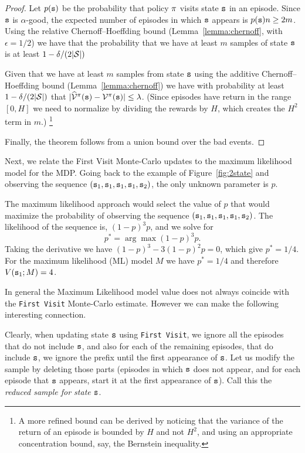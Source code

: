 \begin{advanced}
\begin{proof}
Let $p({\tt s})$ be the probability that policy $\pi$ visits
state ${\tt s}$ in an episode. Since ${\tt s}$ is $\alpha$-good, the
expected number of episodes in which ${\tt s}$ appears is
$p({\tt s})n\geq 2m$. Using the relative
Chernoff--Hoeffding bound (Lemma~\ref{lemma:chernoff}, with $\epsilon=1/2$) we have that
the probability that we have at least $m$ samples of state ${\tt s}$
is at least $1-\delta/(2|\mathcal{S}|)$

Given that we have at least $m$ samples from state ${\tt s}$ using
the additive Chernoff--Hoeffding bound (Lemma~\ref{lemma:chernoff})
we have with probability at least $1-\delta/(2|\mathcal{S}|)$ that
$|\widehat{\mathcal{V}}^\pi({\tt s})-\mathcal{V}^\pi({\tt s})|\leq
\lambda$. 
(Since episodes have return in the range $[0,H]$ we need to normalize by dividing the rewards by $H$, which creates the $H^2$ term in $m$.)
\footnote{A more refined bound can be derived by noticing that the
variance of the return of an episode is bounded by $H$ and not
$H^2$, and using an appropriate concentration bound, say, the Bernstein
inequality.}

Finally, the theorem follows from a union bound over the bad events.
\end{proof}


Next, we relate the First Visit Monte-Carlo updates to the maximum
likelihood model for the MDP. Going back to the example of
Figure~\ref{fig:2state} and observing the sequence
$({\tt s}_1,{\tt s}_1,{\tt s}_1,{\tt s}_1,{\tt s}_2)$, the only unknown
parameter is $p$.

The maximum likelihood approach would select the value of $p$ that
would maximize the probability of observing the sequence
$({\tt s}_1,{\tt s}_1,{\tt s}_1,{\tt s}_1,{\tt s}_2)$. The likelihood of
the sequence is, $(1-p)^3p$, and we solve for
\[
p^* = \arg\max (1-p)^3 p.
\]
Taking the derivative we have $(1-p)^3-3(1-p)^2p=0$, which give
$p^*=1/4$.
%
For the maximum likelihood (ML) model $M$ we have $p^*=1/4$ and
therefore $V({\tt s}_1;M)=4$.

In general the Maximum Likelihood model value does not always
coincide with the {\tt First Visit} Monte-Carlo estimate. However we
can make the following interesting connection.

Clearly, when updating state ${\tt s}$ using {\tt First Visit}, we
ignore all the episodes that do not include ${\tt s}$, and also for
each of the remaining episodes, that do include ${\tt s}$, we ignore the
prefix until the first appearance of ${\tt s}$. Let us modify the
sample by deleting those parts (episodes in which ${\tt s}$ does not
appear, and for each episode that ${\tt s}$ appears, start it at the
first appearance of ${\tt s}$). Call this the {\em reduced sample for state ${\tt s}$}.



\end{advanced}

